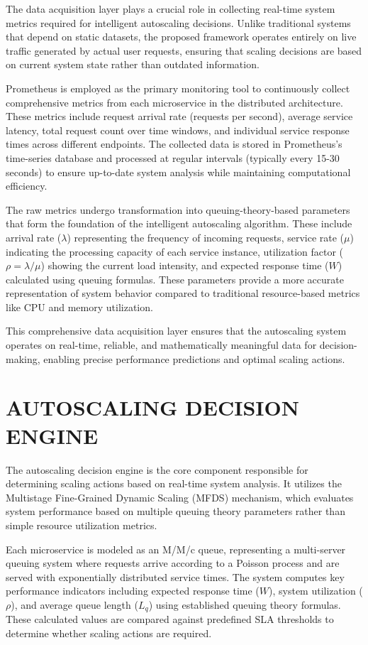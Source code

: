 The data acquisition layer plays a crucial role in collecting real-time system metrics required for intelligent autoscaling decisions. Unlike traditional systems that depend on static datasets, the proposed framework operates entirely on live traffic generated by actual user requests, ensuring that scaling decisions are based on current system state rather than outdated information.

Prometheus is employed as the primary monitoring tool to continuously collect comprehensive metrics from each microservice in the distributed architecture. These metrics include request arrival rate (requests per second), average service latency, total request count over time windows, and individual service response times across different endpoints. The collected data is stored in Prometheus's time-series database and processed at regular intervals (typically every 15-30 seconds) to ensure up-to-date system analysis while maintaining computational efficiency.

The raw metrics undergo transformation into queuing-theory-based parameters that form the foundation of the intelligent autoscaling algorithm. These include arrival rate ($\lambda$) representing the frequency of incoming requests, service rate ($\mu$) indicating the processing capacity of each service instance, utilization factor ($\rho = \lambda/\mu$) showing the current load intensity, and expected response time ($W$) calculated using queuing formulas. These parameters provide a more accurate representation of system behavior compared to traditional resource-based metrics like CPU and memory utilization.

This comprehensive data acquisition layer ensures that the autoscaling system operates on real-time, reliable, and mathematically meaningful data for decision-making, enabling precise performance predictions and optimal scaling actions.


\section{AUTOSCALING DECISION ENGINE}
 
The autoscaling decision engine is the core component responsible for determining scaling actions based on real-time system analysis. It utilizes the Multistage Fine-Grained Dynamic Scaling (MFDS) mechanism, which evaluates system performance based on multiple queuing theory parameters rather than simple resource utilization metrics.

Each microservice is modeled as an M/M/c queue, representing a multi-server queuing system where requests arrive according to a Poisson process and are served with exponentially distributed service times. The system computes key performance indicators including expected response time ($W$), system utilization ($\rho$), and average queue length ($L_q$) using established queuing theory formulas. These calculated values are compared against predefined SLA thresholds to determine whether scaling actions are required.

